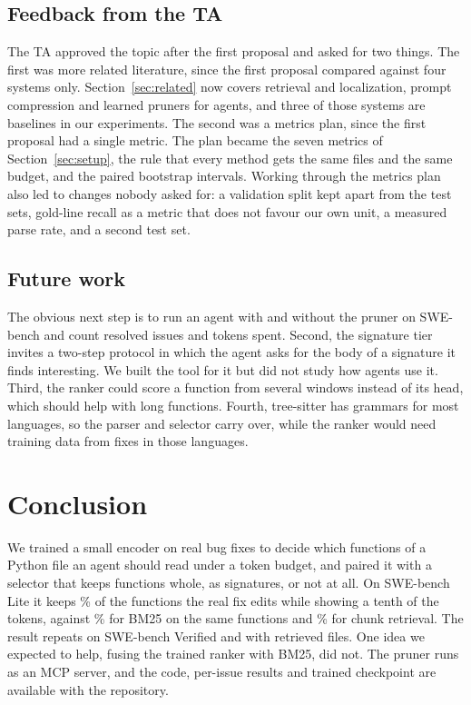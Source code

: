 \subsection{Feedback from the TA}

The TA approved the topic after the first proposal and asked for two things. The first was more related literature, since the first proposal compared against four systems only. Section~\ref{sec:related} now covers retrieval and localization, prompt compression and learned pruners for agents, and three of those systems are baselines in our experiments. The second was a metrics plan, since the first proposal had a single metric. The plan became the seven metrics of Section~\ref{sec:setup}, the rule that every method gets the same files and the same budget, and the paired bootstrap intervals. Working through the metrics plan also led to changes nobody asked for: a validation split kept apart from the test sets, gold-line recall as a metric that does not favour our own unit, a measured parse rate, and a second test set.

\subsection{Future work}

The obvious next step is to run an agent with and without the pruner on SWE-bench and count resolved issues and tokens spent. Second, the signature tier invites a two-step protocol in which the agent asks for the body of a signature it finds interesting. We built the tool for it but did not study how agents use it. Third, the ranker could score a function from several windows instead of its head, which should help with long functions. Fourth, tree-sitter has grammars for most languages, so the parser and selector carry over, while the ranker would need training data from fixes in those languages.

\section{Conclusion}

We trained a small encoder on real bug fixes to decide which functions of a Python file an agent should read under a token budget, and paired it with a selector that keeps functions whole, as signatures, or not at all. On SWE-bench Lite it keeps \% of the functions the real fix edits while showing a tenth of the tokens, against \% for BM25 on the same functions and \% for chunk retrieval. The result repeats on SWE-bench Verified and with retrieved files. One idea we expected to help, fusing the trained ranker with BM25, did not. The pruner runs as an MCP server, and the code, per-issue results and trained checkpoint are available with the repository.
